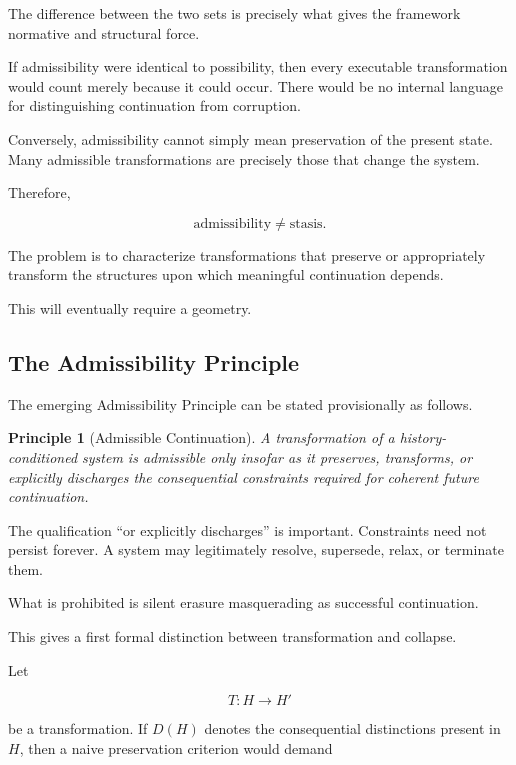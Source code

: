 \documentclass[11pt]{article}
\newtheorem{principle}{Principle}[section]
\theoremstyle{remark}
\begin{document}
The difference between the two sets is precisely what gives the framework normative and structural force.

If admissibility were identical to possibility, then every executable transformation would count merely because it could occur. There would be no internal language for distinguishing continuation from corruption.

Conversely, admissibility cannot simply mean preservation of the present state. Many admissible transformations are precisely those that change the system.

Therefore,

\begin{equation}
\text{admissibility}
\neq
\text{stasis}.
\end{equation}

The problem is to characterize transformations that preserve or appropriately transform the structures upon which meaningful continuation depends.

This will eventually require a geometry.

\subsection{The Admissibility Principle}

The emerging Admissibility Principle can be stated provisionally as follows.

\begin{principle}[Admissible Continuation]
A transformation of a history-conditioned system is admissible only insofar as it preserves, transforms, or explicitly discharges the consequential constraints required for coherent future continuation.
\end{principle}

The qualification ``or explicitly discharges'' is important. Constraints need not persist forever. A system may legitimately resolve, supersede, relax, or terminate them.

What is prohibited is silent erasure masquerading as successful continuation.

This gives a first formal distinction between transformation and collapse.

Let

\begin{equation}
T:H\rightarrow H'
\end{equation}

be a transformation. If $D(H)$ denotes the consequential distinctions present in $H$, then a naive preservation criterion would demand
\end{document}
